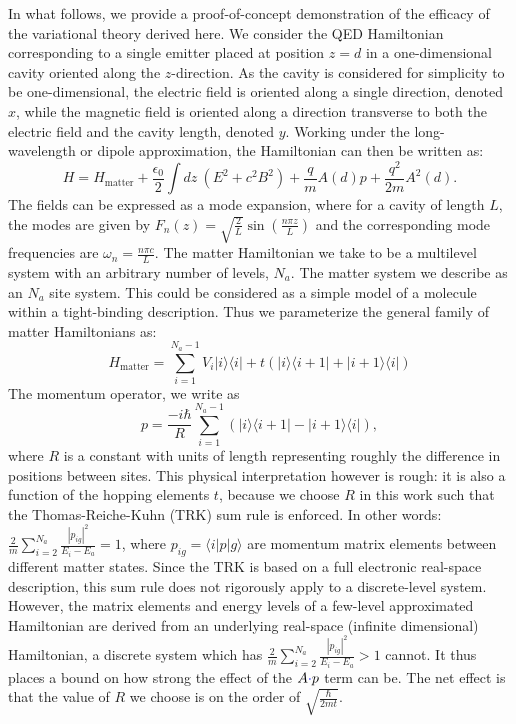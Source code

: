 \documentclass[aps,prl,twocolumn,
	groupedaddress,superscriptaddress,
	amsfonts,amssymb,amsmath,floatfix,
	citeautoscript]{revtex4-1}
\newcommand{\Jadd}[1]{\textcolor{blue}{#1}}
\begin{document}
In what follows, we provide a proof-of-concept demonstration of the efficacy of the variational theory derived here. We consider the QED Hamiltonian corresponding to a single emitter placed at position $z=d$ in a one-dimensional cavity oriented along the $z$-direction. As the cavity is considered for simplicity to be one-dimensional, the electric field is oriented along a single direction, denoted $x$, while the magnetic field is oriented along a direction transverse to both the electric field and the cavity length, denoted $y$. Working under the long-wavelength or dipole approximation, the Hamiltonian can then be written as:
\begin{equation}\label{eq:hamiltonian}
H = H_{\text{matter}}+\frac{\epsilon_0}{2}\int dz~(E^2+c^2B^2)+\frac{q}{m}A(d)p + \frac{q^2}{2m}A^2(d).
\end{equation}
The fields can be expressed as a mode expansion, where for a cavity of length $L$, the modes are given by $F_n(z) = \sqrt{\frac{2}{L}}\sin\left(\frac{n\pi z}{L} \right)$ and the corresponding mode frequencies are $\omega_n = \frac{n\pi c}{L}$. The matter Hamiltonian we take to be a multilevel system with an arbitrary number of levels, $N_a$. The matter system we describe as an $N_a$ site system. This could be considered as a simple model of a molecule within a tight-binding description. Thus we parameterize the general family of matter Hamiltonians as:
\begin{equation}\label{eq:matter_hamiltonian}
H_{\text{matter}} = \sum\limits_{i=1}^{{N_a-1}} V_i|i\rangle\langle i|+t(|i\rangle\langle i+1|+|i+1\rangle\langle i|) 
\end{equation}
The momentum operator, we write as 
\begin{equation}\label{eq:momentum_operator}
p = \frac{-i\hbar}{R}\sum\limits_{i=1}^{N_a-1} \left(|i\rangle\langle i+1|-|i+1\rangle\langle i| \right),
\end{equation}
where $R$ is a constant with units of length representing roughly the difference in positions between sites. This physical interpretation however is rough: it is also a function of the hopping elements $t$, because we choose $R$ in this work such that the Thomas-Reiche-Kuhn (TRK) sum rule is enforced. In other words: $\frac{2}{m}\sum\limits_{i=2}^{N_a}\frac{|p_{ig}|^2}{E_i - E_a} = 1$, where $p_{ig} = \langle i|p|g\rangle$ are momentum matrix elements between different matter states.  Since the TRK is based on a full electronic real-space description, this sum rule does not rigorously apply to a discrete-level system. However, the matrix elements and energy levels of a few-level approximated Hamiltonian  are derived from an underlying real-space (infinite dimensional) Hamiltonian, a discrete system which has  $\frac{2}{m}\sum\limits_{i=2}^{N_a}\frac{|p_{ig}|^2}{E_i - E_a} > 1$ cannot. It thus places a bound on how strong the effect of the $A\Jadd{\cdot}p$ term can be. The net effect is that the value of $R$ we choose is on the order of $\sqrt{\frac{\hbar}{2mt}}$.
\end{document}
